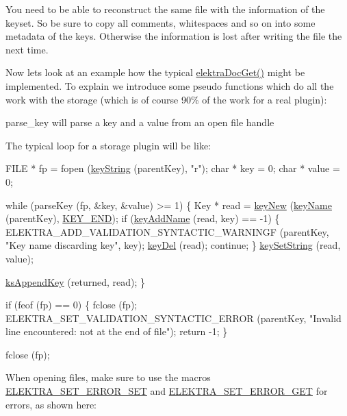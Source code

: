 You need to be able to reconstruct the same file with the information of the keyset. So be sure to copy all comments, whitespaces and so on into some metadata of the keys. Otherwise the information is lost after writing the file the next time.

Now lets look at an example how the typical \hyperlink{group__plugin_gacb69f3441c6d84241b4362f958fbe313}{elektra\+Doc\+Get()} might be implemented. To explain we introduce some pseudo functions which do all the work with the storage (which is of course 90\% of the work for a real plugin)\+:
\begin{DoxyItemize}
\item parse\+\_\+key will parse a key and a value from an open file handle
\end{DoxyItemize}

The typical loop for a storage plugin will be like\+:


\begin{DoxyCodeInclude}
        FILE * fp = fopen (\hyperlink{group__keyvalue_ga880936f2481d28e6e2acbe7486a21d05}{keyString} (parentKey), \textcolor{stringliteral}{"r"});
        \textcolor{keywordtype}{char} * key = 0;
        \textcolor{keywordtype}{char} * value = 0;

        \textcolor{keywordflow}{while} (parseKey (fp, &key, &value) >= 1)
        \{
                Key * read = \hyperlink{group__key_gad23c65b44bf48d773759e1f9a4d43b89}{keyNew} (\hyperlink{group__keyname_ga8e805c726a60da921d3736cda7813513}{keyName} (parentKey), \hyperlink{group__key_gga9b703ca49f48b482def322b77d3e6bc8aa8adb6fcb92dec58fb19410eacfdd403}{KEY\_END});
                \textcolor{keywordflow}{if} (\hyperlink{group__keyname_gaa70593a2c772c4b7bc33423b9b10a270}{keyAddName} (read, key) == -1)
                \{
                        ELEKTRA\_ADD\_VALIDATION\_SYNTACTIC\_WARNINGF (parentKey, \textcolor{stringliteral}{"Key name %
       discarding key"}, key);
                        \hyperlink{group__key_ga3df95bbc2494e3e6703ece5639be5bb1}{keyDel} (read);
                        \textcolor{keywordflow}{continue};
                \}
                \hyperlink{group__keyvalue_ga622bde1eb0e0c4994728331326340ef2}{keySetString} (read, value);

                \hyperlink{group__keyset_gaa5a1d467a4d71041edce68ea7748ce45}{ksAppendKey} (returned, read);
        \}

        \textcolor{keywordflow}{if} (feof (fp) == 0)
        \{
                fclose (fp);
                ELEKTRA\_SET\_VALIDATION\_SYNTACTIC\_ERROR (parentKey, \textcolor{stringliteral}{"Invalid line encountered: not at the
       end of file"});
                \textcolor{keywordflow}{return} -1;
        \}

        fclose (fp);
\end{DoxyCodeInclude}
 When opening files, make sure to use the macros \hyperlink{group__plugin_gaf526686f01dbacd68671732aad4b5d76}{E\+L\+E\+K\+T\+R\+A\+\_\+\+S\+E\+T\+\_\+\+E\+R\+R\+O\+R\+\_\+\+S\+ET} and \hyperlink{group__plugin_ga2f5d331ed725c6af0c511a0aa8677daa}{E\+L\+E\+K\+T\+R\+A\+\_\+\+S\+E\+T\+\_\+\+E\+R\+R\+O\+R\+\_\+\+G\+ET} for errors, as shown here\+:


